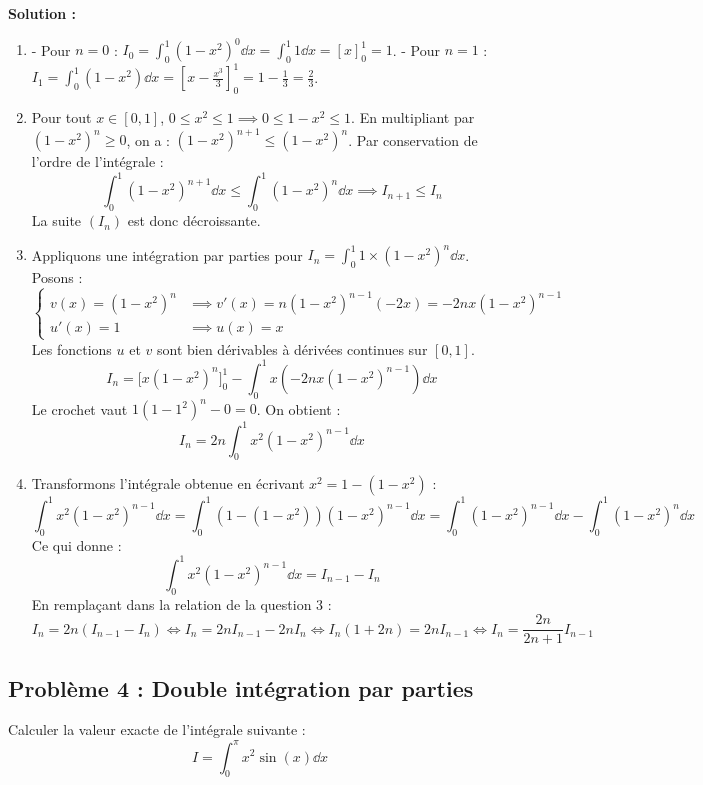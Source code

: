 \textbf{Solution :}
\begin{enumerate}
    \item - Pour $n = 0$ : $I_0 = \int_0^1 (1-x^2)^0 \dd x = \int_0^1 1 \dd x = [x]_0^1 = 1$.
      - Pour $n = 1$ : $I_1 = \int_0^1 (1-x^2) \dd x = \left[ x - \frac{x^3}{3} \right]_0^1 = 1 - \frac{1}{3} = \frac{2}{3}$.
      
    \item Pour tout $x \in [0, 1]$, $0 \le x^2 \le 1 \implies 0 \le 1-x^2 \le 1$.
      En multipliant par $(1-x^2)^n \ge 0$, on a : $(1-x^2)^{n+1} \le (1-x^2)^n$.
      Par conservation de l'ordre de l'intégrale :
      \[
      \int_0^1 (1-x^2)^{n+1} \dd x \le \int_0^1 (1-x^2)^n \dd x \implies I_{n+1} \le I_n
      \]
      La suite $(I_n)$ est donc décroissante.
      
    \item Appliquons une intégration par parties pour $I_n = \int_0^1 1 \times (1-x^2)^n \dd x$.
      Posons :
      \[
      \begin{cases}
      v(x) = (1-x^2)^n & \implies v'(x) = n(1-x^2)^{n-1}(-2x) = -2nx(1-x^2)^{n-1} \\
      u'(x) = 1 & \implies u(x) = x
      \end{cases}
      \]
      Les fonctions $u$ et $v$ sont bien dérivables à dérivées continues sur $[0, 1]$.
      \[
      I_n = \Big[ x(1-x^2)^n \Big]_0^1 - \int_0^1 x \left( -2nx(1-x^2)^{n-1} \right) \dd x
      \]
      Le crochet vaut $1(1-1^2)^n - 0 = 0$. On obtient :
      \[
      I_n = 2n \int_0^1 x^2 (1 - x^2)^{n-1} \dd x
      \]
      
    \item Transformons l'intégrale obtenue en écrivant $x^2 = 1 - (1-x^2)$ :
      \[
      \int_0^1 x^2 (1 - x^2)^{n-1} \dd x = \int_0^1 (1 - (1-x^2)) (1-x^2)^{n-1} \dd x = \int_0^1 (1-x^2)^{n-1} \dd x - \int_0^1 (1-x^2)^n \dd x
      \]
      Ce qui donne :
      \[
      \int_0^1 x^2 (1 - x^2)^{n-1} \dd x = I_{n-1} - I_n
      \]
      En remplaçant dans la relation de la question 3 :
      \[
      I_n = 2n(I_{n-1} - I_n) \iff I_n = 2n I_{n-1} - 2n I_n \iff I_n(1 + 2n) = 2n I_{n-1} \iff I_n = \frac{2n}{2n+1} I_{n-1}
      \]
\end{enumerate}

\subsection*{Problème 4 : Double intégration par parties}
Calculer la valeur exacte de l'intégrale suivante :
\[
I = \int_0^{\pi} x^2 \sin(x) \dd x
\]

